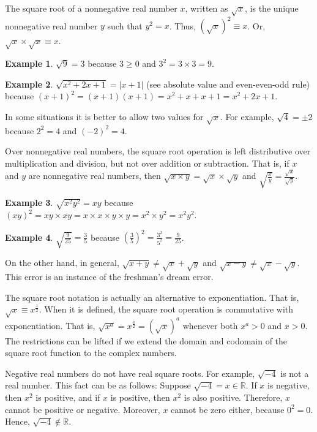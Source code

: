 \documentclass{article}
\theoremstyle{definition}
\newtheorem*{ex*}{Example}
\begin{document}
The square root of a nonnegative real number $x$, written as $\sqrt{x}$, is the unique nonnegative real number $y$ such that $y^2=x$.  Thus, $(\sqrt{x})^2 \equiv x$.  Or, $\sqrt{x}\times\sqrt{x}\equiv x$.

\begin{ex*}
$\sqrt{9}=3$ because $3\geq 0$ and $3^2=3\times 3=9$.
\end{ex*}

\begin{ex*}
$\sqrt{x^2+2x+1}=\vert x+1\vert$ (see absolute value and even-even-odd rule) because $(x+1)^2=(x+1)(x+1)=x^2+x+x+1=x^2+2x+1$.
\end{ex*}

In some situations it is better to allow two values for $\sqrt{x}$.  For example, $\sqrt{4}=\pm 2$ because $2^2=4$ and $(-2)^2=4$.

Over nonnegative real numbers, the square root operation is left distributive over multiplication and division, but not over addition or subtraction.  That is, if $x$ and $y$ are nonnegative real numbers, then $\sqrt{x\times y}=\sqrt{x}\times\sqrt{y}$ and $\displaystyle \sqrt{\frac{x}{y}}=\frac{\sqrt{x}}{\sqrt{y}}$.

\begin{ex*}
$\sqrt{x^{2}y^{2}}=xy$ because $(xy)^2=xy\times xy=x\times x\times y\times y=x^2\times y^2=x^{2}y^{2}$.
\end{ex*}

\begin{ex*}
$\displaystyle \sqrt{\frac{9}{25}}=\frac{3}{5}$ because $\displaystyle\left(\frac{3}{5}\right)^2=\frac{3^2}{5^2}=\frac{9}{25}$.
\end{ex*}

On the other hand, in general, $\sqrt{x+y}\neq\sqrt{x}+\sqrt{y}$ and $\sqrt{x-y}\neq\sqrt{x}-\sqrt{y}$.  This error is an instance of the freshman's dream error.

The square root notation is actually an alternative to exponentiation.  That is, $\sqrt{x} \equiv x^\frac{1}{2}$.  When it is defined, the square root operation is commutative with exponentiation.  That is, $\sqrt{x^a}=x^\frac{a}{2}=(\sqrt{x})^a$ whenever both $x^a>0$ and $x>0$.  The restrictions can be lifted if we extend the domain and codomain of the square root function to the complex numbers.

Negative real numbers do not have real square roots.  For example, $\sqrt{-4}$ is not a real number.  This fact can be  as follows:  Suppose $\sqrt{-4}=x\in\mathbb{R}$.  If $x$ is negative, then $x^2$ is positive, and if $x$ is positive, then $x^2$ is also positive.  Therefore, $x$ cannot be positive or negative.  Moreover, $x$ cannot be zero either, because $0^2=0$.  Hence, $\sqrt{-4}\notin\mathbb{R}$.
\end{document}
